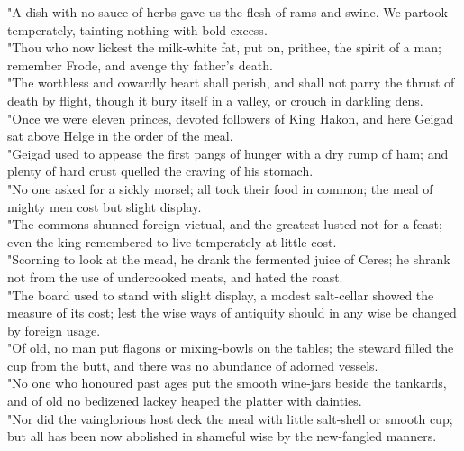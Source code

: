 \documentclass[10pt,a4paper]{report}
\begin{document}
"A dish with no sauce of herbs gave us the flesh of rams and swine. We partook temperately, tainting nothing with bold excess.\\

"Thou who now lickest the milk-white fat, put on, prithee, the spirit of a man; remember Frode, and avenge thy father's death.\\

"The worthless and cowardly heart shall perish, and shall not parry the thrust of death by flight, though it bury itself in a valley, or crouch in darkling dens.\\

"Once we were eleven princes, devoted followers of King Hakon, and here Geigad sat above Helge in the order of the meal.\\

"Geigad used to appease the first pangs of hunger with a dry rump of ham; and plenty of hard crust quelled the craving of his stomach.\\

"No one asked for a sickly morsel; all took their food in common; the meal of mighty men cost but slight display.\\

"The commons shunned foreign victual, and the greatest lusted not for a feast; even the king remembered to live temperately at little cost.\\

"Scorning to look at the mead, he drank the fermented juice of Ceres; he shrank not from the use of undercooked meats, and hated the roast.\\

"The board used to stand with slight display, a modest salt-cellar showed the measure of its cost; lest the wise ways of antiquity should in any wise be changed by foreign usage.\\

"Of old, no man put flagons or mixing-bowls on the tables; the steward filled the cup from the butt, and there was no abundance of adorned vessels.\\

"No one who honoured past ages put the smooth wine-jars beside the tankards, and of old no bedizened lackey heaped the platter with dainties.\\

"Nor did the vainglorious host deck the meal with little salt-shell or smooth cup; but all has been now abolished in shameful wise by the new-fangled manners.\\
\end{document}
